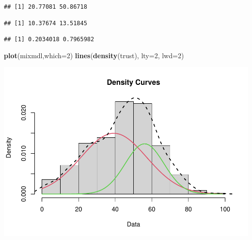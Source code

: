 \documentclass[
]{book}
\newenvironment{Shaded}{\begin{snugshade}}{\end{snugshade}}
\newcommand{\DataTypeTok}[1]{\textcolor[rgb]{0.13,0.29,0.53}{#1}}
\newcommand{\DecValTok}[1]{\textcolor[rgb]{0.00,0.00,0.81}{#1}}
\newcommand{\KeywordTok}[1]{\textcolor[rgb]{0.13,0.29,0.53}{\textbf{#1}}}
\newcommand{\NormalTok}[1]{#1}
\newcommand{\OperatorTok}[1]{\textcolor[rgb]{0.81,0.36,0.00}{\textbf{#1}}}
\begin{document}
\begin{verbatim}
## [1] 20.77081 50.86718
\end{verbatim}

\begin{Shaded}
\end{Shaded}

\begin{verbatim}
## [1] 10.37674 13.51845
\end{verbatim}

\begin{Shaded}
\end{Shaded}

\begin{verbatim}
## [1] 0.2034018 0.7965982
\end{verbatim}

\begin{Shaded}
\begin{Highlighting}[]
\KeywordTok{plot}\NormalTok{(mixmdl,}\DataTypeTok{which=}\DecValTok{2}\NormalTok{)}
\KeywordTok{lines}\NormalTok{(}\KeywordTok{density}\NormalTok{(trust), }\DataTypeTok{lty=}\DecValTok{2}\NormalTok{, }\DataTypeTok{lwd=}\DecValTok{2}\NormalTok{)}
\end{Highlighting}
\end{Shaded}

\includegraphics{bookdown-demo_files/figure-latex/307-2.pdf}
\end{document}
